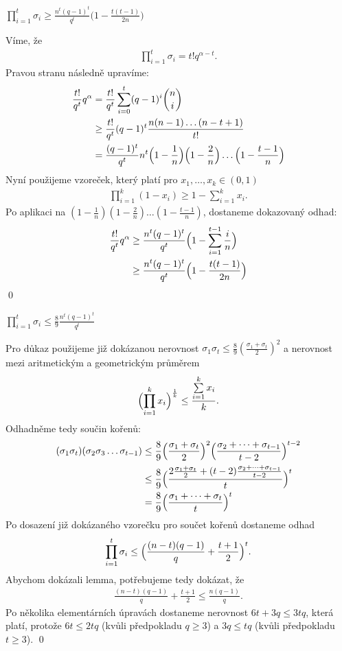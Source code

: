\lm $\prod\limits_{i = 1}^t \sigma_i \geq \frac{n^t (q-1)^t}{q^t}\bigl(1 - \frac{t(t-1)}{2n}\bigr)$

\dk Víme, že
\begin{align*}
\prod\limits_{i = 1}^t \sigma_i = t!q^{\alpha-t}.
\end{align*}
Pravou stranu následně upravíme:
\begin{align*}
\frac{t!}{q^t}q^\alpha &= \frac{t!}{q^t}\sum\limits_{i = 0}^{t}(q - 1)^i{n \choose i} \\
&\geq \frac{t!}{q^t} (q - 1)^t \frac{n(n-1)\dots(n-t+1)}{t!}  \\
&= \frac{(q-1)^t}{q^t} n^t \Bigl(1 - \frac{1}{n}\Bigr)\Bigl(1 - \frac{2}{n}\Bigr)\dots\Bigl(1 - \frac{t-1}{n}\Bigr)
\end{align*}
Nyní použijeme vzoreček, který platí pro $x_1,\dots,x_k \in (0,1)$
\begin{align*}
\prod\limits_{i=1}^{k} (1 - x_i) \geq 1 - \sum\limits_{i=1}^{k} x_i.
\end{align*}
Po aplikaci na $(1 - \frac{1}{n})(1 - \frac{2}{n})\dots(1 - \frac{t-1}{n})$, dostaneme dokazovaný odhad:
\begin{align*}
\frac{t!}{q^t}q^\alpha &\geq \frac{n^t (q-1)^t}{q^t}\Bigl(1 - \sum\limits_{i=1}^{t-1} \frac{i}{n}\Bigr) \\
&\geq \frac{n^t (q-1)^t}{q^t}\Bigl(1 - \frac{t(t-1)}{2n}\Bigr) 
\end{align*}
\qed

\lm $\prod\limits_{i = 1}^t \sigma_i \leq \frac{8}{9}\frac{n^t(q-1)^t}{q^t}$

\dk Pro důkaz použijeme již dokázanou nerovnost $\sigma_1\sigma_t \leq \frac{8}{9}(\frac{\sigma_1+\sigma_t}{2})^2$ a nerovnost mezi aritmetickým a geometrickým průměrem
\begin{align*}
\Bigl(\prod\limits_{i=1}^k x_i \Bigr)^{\frac{1}{k}} \leq \frac{\sum\limits_{i=1}^k x_i}{k}.
\end{align*}
Odhadněme tedy součin kořenů:
\begin{align*}
(\sigma_1\sigma_t)(\sigma_2\sigma_3\dots\sigma_{t-1}) &\leq \frac{8}{9}\Bigl(\frac{\sigma_1+\sigma_t}{2}\Bigr)^2\Bigl(\frac{\sigma_2 + \dots + \sigma_{t-1}}{t-2}\Bigr)^{t-2} \\
&\leq \frac{8}{9} \Bigl(\frac{2\frac{\sigma_1 + \sigma_t}{2} + (t-2)\frac{\sigma_2 + \dots + \sigma_{t-1}}{t-2}}{t}\Bigr)^t \\
&=\frac{8}{9}\Bigl(\frac{\sigma_1 + \dots + \sigma_t}{t}\Bigr)^t
\end{align*}
Po dosazení již dokázaného vzorečku pro součet kořenů dostaneme odhad
\begin{align*}
\prod\limits_{i = 1}^{t} \sigma_i \leq \Bigl(\frac{(n-t)(q-1)}{q} + \frac{t+1}{2}\Bigr)^t.
\end{align*}
Abychom dokázali lemma, potřebujeme tedy dokázat, že
\begin{align*}
\frac{(n-t)(q-1)}{q} + \frac{t+1}{2} \leq \frac{n(q-1)}{q}.
\end{align*}
Po několika elementárních úpravách dostaneme nerovnost $6t + 3q \leq 3tq$, která platí, protože $6t \leq 2tq$ (kvůli předpokladu $q \geq 3$) a $3q \leq tq$ (kvůli předpokladu $t \geq 3$).
\qed

